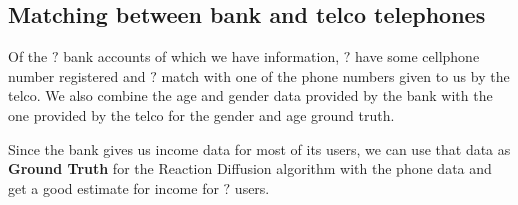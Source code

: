 \subsection{Matching between bank and telco telephones}

Of the \( ? \) bank accounts of which we have information, \( ? \) have some cellphone number registered and \( ? \) match with one of the phone numbers given to us by the telco. We also combine the age and gender data provided by the bank with the one provided by the telco for the gender and age ground truth.

Since the bank gives us income data for most of its users, we can use that data as \textbf{Ground Truth} for the Reaction Diffusion algorithm with the phone data and get a good estimate for income for \( ? \) users.
